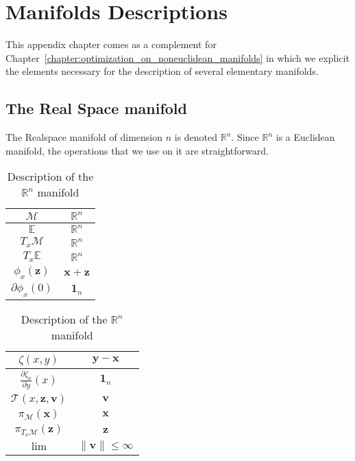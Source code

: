 

\chapter{Manifolds Descriptions}
\label{appendix:manifolds}

\graphicspath{{Appendix2-Manifolds/Figs/}}

This appendix chapter comes as a complement for Chapter~\ref{chapter:optimization_on_noneuclidean_manifolds} in which we explicit the elements necessary for the description of several elementary manifolds.

\section{The Real Space manifold}
\label{sec:the_real_space}
The Realspace manifold of dimension $n$ is denoted $\mathbb{R}^n$.
Since $\mathbb{R}^n$ is a Euclidean manifold, the operations that we use on it are straightforward.

\begin{table} [H]
\caption{Description of the $\mathbb{R}^n$ manifold}
\centering
\begin{tabular}{cc}
  \toprule
  $\mathcal{M}$ & $\mathbb{R}^n$ \\
  \midrule
  $\mathbb{E}$ & $\mathbb{R}^n$ \\
  \midrule
  $T_x\mathcal{M}$ & $\mathbb{R}^n$ \\
  \midrule
  $T_x\mathbb{E}$ & $\mathbb{R}^n$ \\
  \midrule
  $\phi_x(\mathbf{z})$ & $\mathbf{x} + \mathbf{z}$ \\
  \midrule
  $\partial \phi_x(0)$ & $\mathbf{1}_n$ \\
  \bottomrule
\end{tabular}
\quad
\begin{tabular}{cc}
  \toprule
  $\zeta(x,y)$ & $\mathbf{y} - \mathbf{x}$ \\
  \midrule
  $\frac{\partial \zeta_x}{\partial y}(x)$ & $\mathbf{1}_n$ \\
  \midrule
  $\mathcal{T}(x,\mathbf{z}, \mathbf{v})$ & $\mathbf{v}$ \\
  \midrule
  $\pi_\mathcal{M}(\mathbf{x})$ & $\mathbf{x}$ \\
  \midrule
  $\pi_{T_x\mathcal{M}}(\mathbf{z})$ & $\mathbf{z}$ \\
  \midrule
  $\lim$ & $\|\mathbf{v}\| \leq \infty$ \\
  \bottomrule
\end{tabular}
\end{table}

